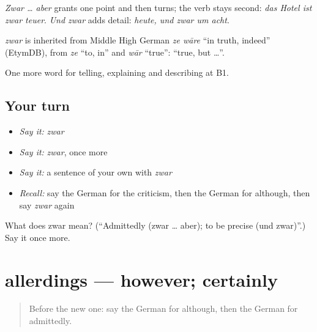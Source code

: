 \emph{Zwar … aber} grants one point and then turns; the verb stays second: \emph{das Hotel ist zwar teuer}. \emph{Und zwar} adds detail: \emph{heute, und zwar um acht}.

\begin{cousinweb}
\emph{zwar} is inherited from Middle High German \emph{ze wāre} \textquotedblleft{}in truth, indeed\textquotedblright{} (EtymDB), from \emph{ze} \textquotedblleft{}to, in\textquotedblright{} and \emph{wār} \textquotedblleft{}true\textquotedblright{}: \textquotedblleft{}true, but …\textquotedblright{}.
\end{cousinweb}

\begin{grammarlens}[title={What you've built}]
One more word for telling, explaining and describing at B1.
\end{grammarlens}

\subsection*{Your turn}
\begin{itemize}
\raggedright
  \item \emph{Say it:} \emph{zwar}
  \item \emph{Say it:} \emph{zwar}, once more
  \item \emph{Say it:} a sentence of your own with \emph{zwar}
  \item \emph{Recall:} say the German for the criticism, then the German for although, then say \emph{zwar} again
\end{itemize}

\begin{tcolorbox}[breakable,colback=teal!4,colframe=teal!35!black,title={Before you move on}]
What does zwar mean? (\textquotedblleft{}Admittedly (zwar … aber); to be precise (und zwar)\textquotedblright{}.) Say it once more.
\end{tcolorbox}
\section[allerdings]{allerdings — however; certainly}

\label{lesson:GE-C341-allerdings}



\begin{quote}
Before the new one: say the German for although, then the German for admittedly.
\end{quote}

